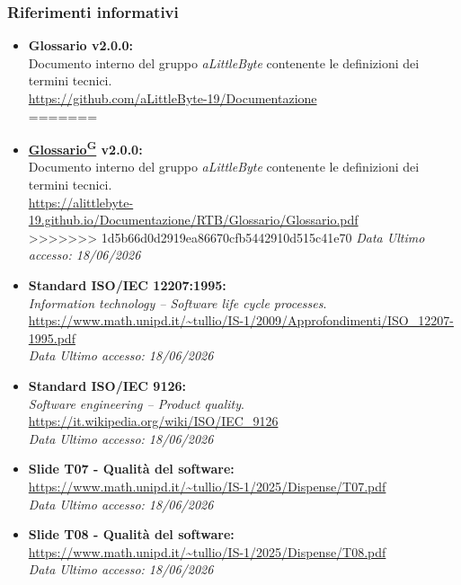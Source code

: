 ﻿\documentclass[a4paper,12pt]{article}
\providecommand{\glslink}[2]{\href{https://alittlebyte-19.github.io/Documentazione/glossario.html\#gls-#1}{\underline{#2}\textsuperscript{\scriptsize G}}}
\begin{document}
\subsubsection{Riferimenti informativi}
\begin{itemize}
<<<<<<< HEAD
    \item \textbf{Glossario v2.0.0:}\\
    Documento interno del gruppo \textit{aLittleByte} contenente le definizioni dei termini tecnici.\\
    \url{https://github.com/aLittleByte-19/Documentazione}\\
=======
    \item \textbf{\glslink{glossario}{Glossario} v2.0.0:}\\
    Documento interno del gruppo \textit{aLittleByte} contenente le definizioni dei termini tecnici.\\
    \url{https://alittlebyte-19.github.io/Documentazione/RTB/Glossario/Glossario.pdf}\\
>>>>>>> 1d5b66d0d2919ea86670cfb5442910d515c41e70
    \textit{Data Ultimo accesso: 18/06/2026}

    \item \textbf{Standard ISO/IEC 12207:1995:}\\
    \textit{Information technology -- Software life cycle processes}.\\
    \url{https://www.math.unipd.it/~tullio/IS-1/2009/Approfondimenti/ISO_12207-1995.pdf}\\
    \textit{Data Ultimo accesso: 18/06/2026}

    \item \textbf{Standard ISO/IEC 9126:}\\
    \textit{Software engineering -- Product quality}.\\
    \url{https://it.wikipedia.org/wiki/ISO/IEC_9126}\\
    \textit{Data Ultimo accesso: 18/06/2026}

    \item \textbf{Slide T07 - Qualità del software:}\\
    \url{https://www.math.unipd.it/~tullio/IS-1/2025/Dispense/T07.pdf}\\
    \textit{Data Ultimo accesso: 18/06/2026}

    \item \textbf{Slide T08 - Qualità del software:}\\
    \url{https://www.math.unipd.it/~tullio/IS-1/2025/Dispense/T08.pdf}\\
    \textit{Data Ultimo accesso: 18/06/2026}
\end{itemize}
\end{document}
